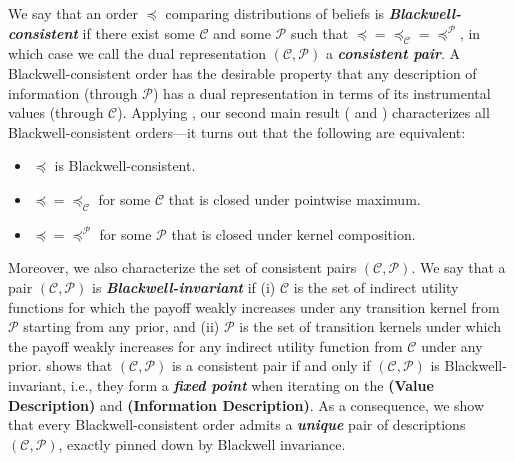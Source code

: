 \documentclass[12pt,letterpaper]{article}
\newenvironment{original}{\color{black}}{}
\theoremstyle{plain}
\theoremstyle{definition}
\theoremstyle{remark}
\newcommand{\Pc}{\mathcal{P}}
\newcommand{\C}{\mathcal{C}}
\theoremstyle{definition}
\begin{document}
\begin{original}
We say that an order $\preceq$ comparing distributions of beliefs is \textit{\textbf{Blackwell-consistent}} if there exist some $\C$ and some $\Pc$ such that $\preceq = \preceq_\C = \preceq^{\Pc}$, in which case we call the dual representation $(\C, \Pc)$ a \textit{\textbf{consistent pair}}. A Blackwell-consistent order has the desirable property that any description of information (through $\Pc$) has a dual representation in terms of its instrumental values (through $\C$). Applying , our second main result ( and ) characterizes all Blackwell-consistent orders---it turns out that the following are equivalent:
\begin{itemize}
    \item[(a)] $\preceq$ is Blackwell-consistent.
    \item[(b)] $\preceq = \preceq_\C$ for some $\C$ that is closed under pointwise maximum.
    \item[(c)] $\preceq = \preceq^\Pc$ for some $\Pc$ that is closed under kernel composition.
\end{itemize}
Moreover, we also characterize the set of consistent pairs $(\C, \Pc)$. We say that a pair $(\C, \Pc)$ is \textit{\textbf{Blackwell-invariant}} if (i) $\C$ is the set of indirect utility functions for which the payoff weakly increases under any transition kernel from $\Pc$ starting from any prior, and (ii) $\Pc$ is the set of transition kernels under which the payoff weakly increases for any indirect utility function from $\C$ under any prior.  shows that $(\C, \Pc)$ is a consistent pair if and only if $(\C, \Pc)$ is Blackwell-invariant, i.e., they form a \textit{\textbf{fixed point}} when iterating on the \textbf{(Value Description)} and \textbf{(Information Description)}. As a consequence, we show that every Blackwell-consistent order admits a \textit{\textbf{unique}} pair of descriptions $(\C, \Pc)$, exactly pinned down by Blackwell invariance.
\end{original}
\end{document}
